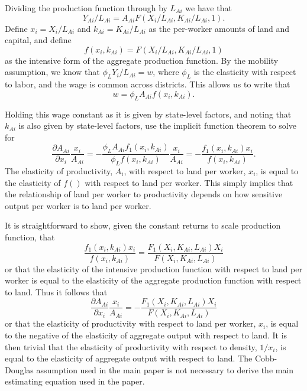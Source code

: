 \documentclass[11pt]{article}
\begin{document}
Dividing the production function through by $L_{Ai}$ we have that
\begin{equation}
   Y_{Ai}/L_{Ai} = A_{Ai} F(X_i/L_{Ai},K_{Ai}/L_{Ai},1).
\end{equation}
Define $x_i = X_i/L_{Ai}$ and $k_{Ai} = K_{Ai}/L_{Ai}$ as the per-worker amounts of land and capital, and define
\begin{equation}
    f(x_i,k_{Ai}) = F(X_i/L_{Ai},K_{Ai}/L_{Ai},1)
\end{equation}
as the intensive form of the aggregate production function. By the mobility assumption, we know that $\phi_L Y_i/L_{Ai} = w$, where $\phi_L$ is the elasticity with respect to labor, and the wage is common across districts. This allows us to write that 
\begin{equation}
    w = \phi_L A_{Ai} f(x_i,k_{Ai}).
\end{equation}

Holding this wage constant as it is given by state-level factors, and noting that $k_{Ai}$ is also given by state-level factors, use the implicit function theorem to solve for
\begin{equation}
    \frac{\partial A_{Ai}}{\partial x_i} \frac{x_i}{A_{Ai}} = - \frac{\phi_L A_{Ai} f_1(x_i,k_{Ai})}{\phi_L f(x_i,k_{Ai})}\frac{x_i}{A_{Ai}} = - \frac{f_1(x_i,k_{Ai}) x_i}{f(x_i,k_{Ai})}.
\end{equation}
The elasticity of productivity, $A_i$, with respect to land per worker, $x_i$, is equal to the elasticity of $f()$ with respect to land per worker. This simply implies that the relationship of land per worker to productivity depends on how sensitive output per worker is to land per worker. 

It is straightforward to show, given the constant returns to scale production function, that
\begin{equation}
    \frac{f_1(x_i,k_{Ai}) x_i}{f(x_i,k_{Ai})} = \frac{F_1(X_i,K_{Ai},L_{Ai}) X_i}{F(X_i,K_{Ai},L_{Ai})}
\end{equation}
or that the elasticity of the intensive production function with respect to land per worker is equal to the elasticity of the aggregate production function with respect to land. Thus it follows that 
\begin{equation}
    \frac{\partial A_{Ai}}{\partial x_i} \frac{x_i}{A_{Ai}} = - \frac{F_1(X_i,K_{Ai},L_{Ai}) X_i}{F(X_i,K_{Ai},L_{Ai})}
\end{equation}
or that the elasticity of productivity with respect to land per worker, $x_i$, is equal to the negative of the elasticity of aggregate output with respect to land. It is then trivial that the elasticity of productivity with respect to density, $1/x_i$, is equal to the elasticity of aggregate output with respect to land. The Cobb-Douglas assumption used in the main paper is not necessary to derive the main estimating equation used in the paper.
\end{document}
